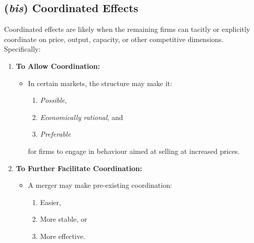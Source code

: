     \setcounter{subsection}{1}
    \subsection{(\textit{bis}) Coordinated Effects}\label{ToH2}

        Coordinated effects are likely when the remaining firms can tacitly or explicitly coordinate on price, output, capacity, or other competitive dimensions. Specifically:
        
        \begin{enumerate}
            \item \textbf{To Allow Coordination:} 
            \begin{itemize}
                \item In certain markets, the structure may make it:
                \begin{enumerate}
                    \item \textit{Possible},
                    \item \textit{Economically rational}, and
                    \item \textit{Preferable} 
                \end{enumerate}
                for firms to engage in behaviour aimed at selling at increased prices.

            \end{itemize}
            
            \item \textbf{To Further Facilitate Coordination:}
            \begin{itemize}
                \item A merger may make pre-existing coordination:
                \begin{enumerate}
                    \item Easier,
                    \item More stable, or
                    \item More effective.
                \end{enumerate}
            \end{itemize}
            

\end{enumerate}
